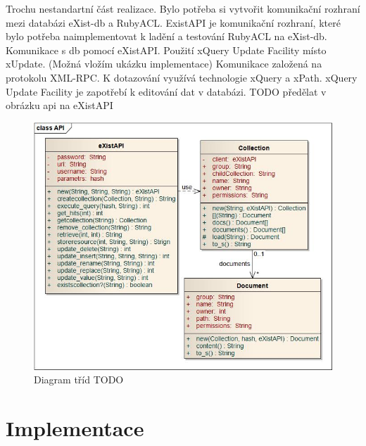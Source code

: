 Trochu nestandartní část realizace. Bylo potřeba si vytvořit komunikační rozhraní mezi databázi eXist-db a RubyACL.
ExistAPI je komunikační rozhraní, které bylo potřeba naimplementovat k ladění a testování RubyACL na eXist-db.
Komunikace s db pomocí eXistAPI.
Použití xQuery Update Facility místo xUpdate. (Možná vložím ukázku implementace)
Komunikace založená na protokolu XML-RPC. K dotazování využívá technologie xQuery a xPath. xQuery Update Facility je zapotřebí k editování dat v databázi.
TODO předělat v obrázku api na eXistAPI
\begin{figure}
\includegraphics[width=15cm]{eXistAPI.jpg}
\caption{Diagram tříd TODO}
\label{fig:Diagram tříd TODO}
\end{figure}

\section{Implementace}



